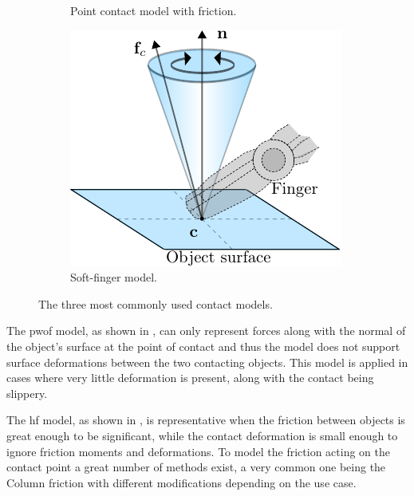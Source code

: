\begin{figure}[h]
\begin{subfigure}[b]{0.3\textwidth}
		\caption{Point contact model with friction.}
		\label{fig:hf}
	\end{subfigure}
	\hfill
	\begin{subfigure}[b]{0.3\textwidth}
		\centering
		\includegraphics[width=\textwidth]{chapters/modeling/fig/sf.pdf}
		\caption{Soft-finger model.}
		\label{fig:sf}
	\end{subfigure}
	   \caption{The three most commonly used contact models.}
	   \label{fig:contact-models}
\end{figure}

The \gls{pwof} model, as shown in , can only represent forces along with the normal of the object's surface at the point of contact and thus the model does not support surface deformations between the two contacting objects. This model is applied in cases where very little deformation is present, along with the contact being slippery\cite[Chapter 38]{handbook-of-robotics}.\medskip

The \gls{hf} model, as shown in , is representative when the friction between objects is great enough to be significant, while the contact deformation is small enough to ignore friction moments and deformations\cite[Chapter 38]{handbook-of-robotics}. To model the friction acting on the contact point a great number of methods exist, a very common one being the Column friction with different modifications depending on the use case\cite*{modelling-of-joint-friction-in-robotic-manipulators-with-gear-transmissions}. \medskip

